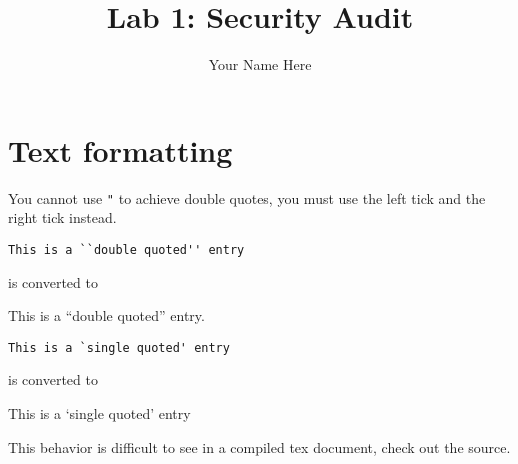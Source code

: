 \documentclass[11pt]{article}
\begin{document}
\author{Your Name Here}
\title{Lab 1: Security Audit}
\maketitle

\section{Text formatting}


You cannot use \verb+"+ to achieve double quotes, you must use the left tick
and the right tick instead.  

\verb+This is a ``double quoted'' entry+

is converted to 

This is a ``double quoted'' entry.

\verb+This is a `single quoted' entry+

is converted to

This is a `single quoted' entry

This behavior is difficult to see in a compiled tex document, check out the 
source.
\end{document}
